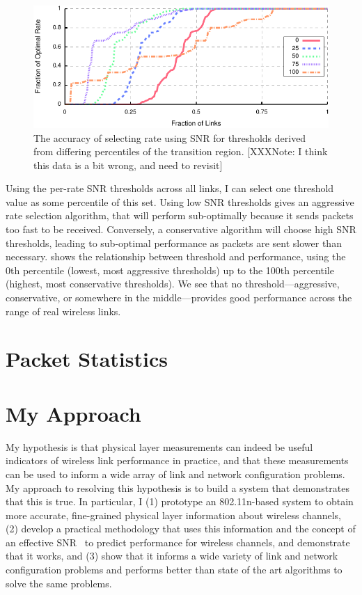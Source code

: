 \begin{figure}[t]
	\centering
	\includegraphics[width=\textwidth]{figures/thresh_vs_opt.pdf}
	\caption{\label{fig:thresh_vs_opt}The accuracy of selecting rate using SNR for thresholds derived from differing percentiles of the transition region. [XXXNote: I think this data is a bit wrong, and need to revisit]}
\end{figure}
Using the per-rate SNR thresholds across all links, I can select one threshold value as some percentile of this set. Using low SNR thresholds gives an aggressive rate selection algorithm, that will perform sub-optimally because it sends packets too fast to be received.  Conversely, a conservative algorithm will choose high SNR thresholds, leading to sub-optimal performance as packets are sent slower than necessary.  shows the relationship between threshold and performance, using the 0th percentile (lowest, most aggressive thresholds) up to the 100th percentile (highest, most conservative thresholds). We see that no threshold---aggressive, conservative, or somewhere in the middle---provides good performance across the range of real wireless links.

\section{Packet Statistics}

\section{My Approach}
My hypothesis is that physical layer measurements can indeed be useful indicators of wireless link performance in practice, and that these measurements can be used to inform a wide array of link and network configuration problems. My approach to resolving this hypothesis is to build a system that demonstrates that this is true. In particular, I (1) prototype an 802.11n-based system to obtain more accurate, fine-grained physical layer information about wireless channels, (2) develop a practical methodology that uses this information and the concept of an effective SNR~\cite{Nanda_EffectiveSNR} to predict performance for wireless channels, and demonstrate that it works, and (3) show that it informs a wide variety of link and network configuration problems and performs better than state of the art algorithms to solve the same problems.

